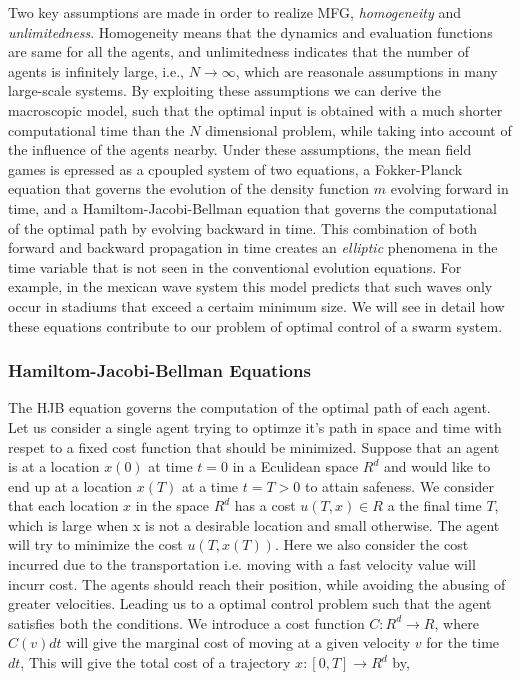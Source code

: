 \documentclass[a4paper, 10pt, conference]{ieeeconf}      %
\begin{document}
Two key assumptions are made in order to realize MFG, \emph{homogeneity} and \emph{unlimitedness}. Homogeneity means that the dynamics and evaluation functions are same for all the agents, and unlimitedness indicates that the number of agents is infinitely large, i.e., $N \rightarrow \infty$, which are reasonale assumptions in many large-scale systems\cite{b1}\cite{b6}. By exploiting these assumptions we can derive the macroscopic model, such that the optimal input is obtained with a much shorter computational time than the $N$ dimensional problem, while taking into account of the influence of the agents nearby\cite{b6}. Under these assumptions, the mean field games is epressed as a cpoupled system of two equations, a Fokker-Planck equation that governs the evolution of the density function $m$ evolving forward in time, and a Hamiltom-Jacobi-Bellman equation that governs the computational of the optimal path by evolving backward in time. This combination of both forward and backward propagation in time creates an \emph{elliptic} phenomena in the time variable that is not seen in the conventional evolution equations. For example, in the mexican wave system this model predicts that such waves only occur in stadiums that exceed a certaim minimum size\cite{b1}. We will see in detail how these equations contribute to our problem of optimal control of a swarm system.\\


\subsubsection{Hamiltom-Jacobi-Bellman Equations}

\hfil \break

The HJB equation governs the computation of the optimal path of each agent. Let us consider a single agent trying to optimze it's path in space and time with respet to a fixed cost function that should be minimized. Suppose that an agent is at a location $x(0)$ at time $t=0$ in a Eculidean space $R^d$ and would like to end up at a location $x(T)$ at a time $t=T > 0$ to attain safeness. We consider that each location $x$ in the space $R^d$ has a cost $u(T,x) \in R$ a the final time $T$, which is large when x is not a desirable location and small otherwise. The agent will try to minimize the cost $u(T, x(T))$. Here we also consider the cost incurred due to the transportation i.e. moving with a fast velocity value will incurr cost. The agents should reach their position, while avoiding the abusing of greater velocities. Leading us to a optimal control problem such that the agent satisfies both the conditions\cite{b8}. We introduce a cost function $C : R^d \rightarrow R$, where $C(v)dt$ will give the marginal cost of moving at a given velocity $v$ for the time $dt$, This will give the total cost of a trajectory $x : [0,T] \rightarrow R^d$ by,
\end{document}
